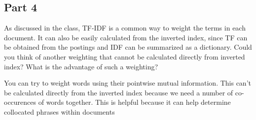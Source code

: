 \documentclass[11pt]{article}
\begin{document}
\begin{Verbatim}[commandchars=\\\{\}]
    \end{Verbatim}

    \subsection{Part 4}\label{part-4}

As discussed in the class, TF-IDF is a common way to weight the terms in
each document. It can also be easily calculated from the inverted index,
since TF can be obtained from the postings and IDF can be summarized as
a dictionary. Could you think of another weighting that cannot be
calculated directly from inverted index? What is the advantage of such a
weighting?

    You can try to weight words using their pointwise mutual information.
This can't be calculated directly from the inverted index because we
need a number of co-occurences of words together. This is helpful
because it can help determine collocated phrases within documents


    
    
    
    
\end{document}

